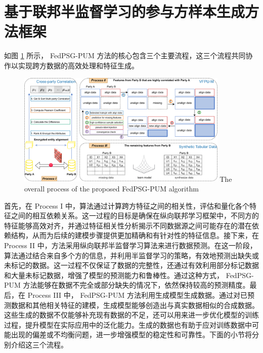 \section{基于联邦半监督学习的参与方样本生成方法框架}
如图 \ref{fig: FedPSG-PUM } 所示， FedPSG-PUM  方法的核心包含三个主要流程，这三个流程共同协作以实现跨方数据的高效处理和特征生成。

\vspace{-0.1cm}
\begin{figure}[h]  %
	\centering     %
	\includegraphics[width=0.9\textwidth]{chapters/imgs/FedPSG-PUM }  
	{\wuhao The overall process of the proposed  FedPSG-PUM  algorithm}
	\label{fig: FedPSG-PUM }  %
\end{figure}
\vspace{-0.35cm}

首先，在 Process I 中，算法通过计算跨方特征之间的相关性，评估和量化各个特征之间的相互依赖关系。这一过程的目标是确保在纵向联邦学习框架中，不同方的特征能够高效对齐，并通过特征相关性分析揭示不同数据源之间可能存在的潜在依赖结构，从而为后续的建模步骤提供更加精确和有针对性的特征信息。接下来，在 Process II 中，方法采用纵向联邦半监督学习算法来进行数据预测。在这一阶段，算法通过结合来自多个方的信息，并利用半监督学习的策略，有效地预测出缺失或未标记的数据。这一过程不仅保证了数据的完整性，还通过有效利用部分标记数据和大量未标记数据，增强了模型的预测能力和鲁棒性。通过这种方式， FedPSG-PUM  方法能够在数据不完全或部分缺失的情况下，依然保持较高的预测精度。最后，在 Process III 中， FedPSG-PUM  方法利用生成模型生成数据。通过对已预测数据和其他相关特征的建模，生成模型能够创造出与真实数据相似的合成数据。这些生成的数据不仅能够补充现有数据的不足，还可以用来进一步优化模型的训练过程，提升模型在实际应用中的泛化能力。生成的数据也有助于应对训练数据中可能出现的偏差或不均衡问题，进一步增强模型的稳定性和可靠性。下面的小节将分别介绍这三个流程。



